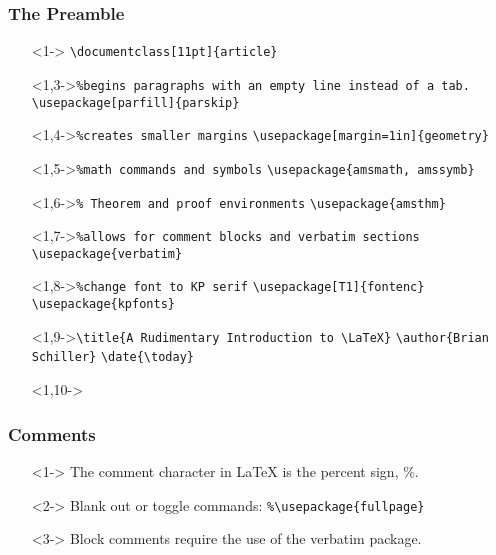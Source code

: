 \begin{frame}[fragile]
	\frametitle{The Preamble}
	\vspace{-12pt}
\begin{itemize}
\item[]<1-> \verb|\documentclass[11pt]{article}| \vspace{-12pt}
\item[]<1,3->\verb|%begins paragraphs with an empty line instead of a tab.|
\verb|\usepackage[parfill]{parskip}|

\item[]<1,4->\verb|%creates smaller margins|
\verb|\usepackage[margin=1in]{geometry}|

\item[]<1,5->\verb|%math commands and symbols|
\verb|\usepackage{amsmath, amssymb}|

\item[]<1,6->\verb|% Theorem and proof environments|
\verb|\usepackage{amsthm}|

\item[]<1,7->\verb|%allows for comment blocks and verbatim sections|
\verb|\usepackage{verbatim}|

\item[]<1,8->\verb|%change font to KP serif|
\verb|\usepackage[T1]{fontenc}|
\verb|\usepackage{kpfonts}|

\item[]<1,9->\verb|\title{A Rudimentary Introduction to \LaTeX}|
\verb|\author{Brian Schiller}|
\verb|\date{\today}|
\item[]<1,10->\verb||
\end{itemize}

\end{frame}

\begin{frame}[fragile]
	\frametitle{Comments}
	\begin{itemize}
	\item[]<1-> The comment character in \LaTeX{} is the percent sign, \%.
	\item[]<2-> Blank out or toggle commands:
		\verb|%\usepackage{fullpage}|
	\item[]<3-> Block comments require the use of the verbatim package.
	\begin{verbatimtab}
	\begin{comment}
		Everything in this section is ignored,
                right up until the line reading:
	\end{comment}
	\end{verbatimtab}
	\end{itemize}
\end{frame}

